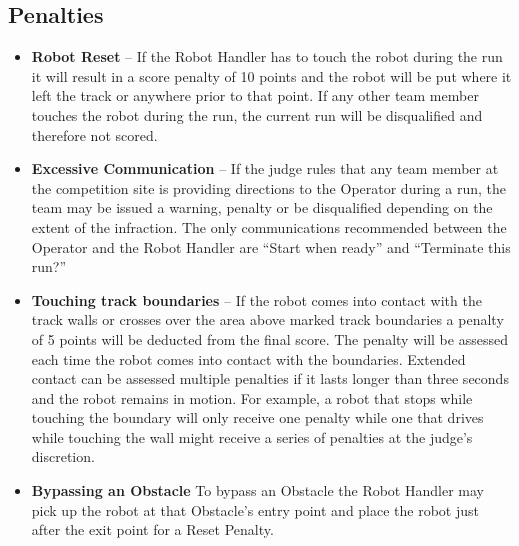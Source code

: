 \subsection{Penalties}
\begin{itemize}
\item \textbf{Robot Reset} – If the Robot Handler has to touch the robot during the run it will result in a score penalty of 10 points and the robot will be put where it left the track or anywhere prior to that point. If any other team member touches the robot during the run, the current run will be disqualified and therefore not scored.
\item \textbf{Excessive Communication} – If the judge rules that any team member at the competition site is providing directions to the Operator during a run, the team may be issued a warning, penalty or be disqualified depending on the extent of the infraction. The only communications recommended between the Operator and the Robot Handler are “Start when ready” and “Terminate this run?” 
\item \textbf{Touching track boundaries} – If the robot comes into contact with the track walls or crosses over the area above marked track boundaries a penalty of 5 points will be deducted from the final score. The penalty will be assessed each time the robot comes into contact with the boundaries. Extended contact can be assessed multiple penalties if it lasts longer than three seconds and the robot remains in motion. For example, a robot that stops while touching the boundary will only receive one penalty while one that drives while touching the wall might receive a series of penalties at the judge’s discretion.
\item \textbf{Bypassing an Obstacle}
\label{bypass}
To bypass an Obstacle the Robot Handler may pick up the robot at that Obstacle’s entry point and place the robot just after the exit point for a Reset Penalty.
\end{itemize}


